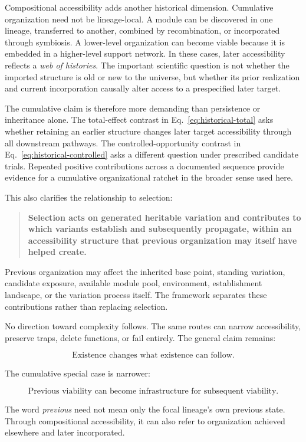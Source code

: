 \documentclass[11pt,a4paper]{article}
\begin{document}
Compositional accessibility adds another historical dimension. Cumulative organization need not be lineage-local. A module can be discovered in one lineage, transferred to another, combined by recombination, or incorporated through symbiosis. A lower-level organization can become viable because it is embedded in a higher-level support network. In these cases, later accessibility reflects a \emph{web of histories}. The important scientific question is not whether the imported structure is old or new to the universe, but whether its prior realization and current incorporation causally alter access to a prespecified later target.

The cumulative claim is therefore more demanding than persistence or inheritance alone. The total-effect contrast in Eq.~\eqref{eq:historical-total} asks whether retaining an earlier structure changes later target accessibility through all downstream pathways. The controlled-opportunity contrast in Eq.~\eqref{eq:historical-controlled} asks a different question under prescribed candidate trials. Repeated positive contributions across a documented sequence provide evidence for a cumulative organizational ratchet in the broader sense used here.

This also clarifies the relationship to selection:

\begin{quote}
\textbf{Selection acts on generated heritable variation and contributes to which variants establish and subsequently propagate, within an accessibility structure that previous organization may itself have helped create.}
\end{quote}

Previous organization may affect the inherited base point, standing variation, candidate exposure, available module pool, environment, establishment landscape, or the variation process itself. The framework separates these contributions rather than replacing selection.

No direction toward complexity follows. The same routes can narrow accessibility, preserve traps, delete functions, or fail entirely. The general claim remains:

\[
\boxed{\text{Existence changes what existence can follow.}}
\]

The cumulative special case is narrower:

\[
\boxed{\text{Previous viability can become infrastructure for subsequent viability.}}
\]

The word \emph{previous} need not mean only the focal lineage's own previous state. Through compositional accessibility, it can also refer to organization achieved elsewhere and later incorporated.
\end{document}
